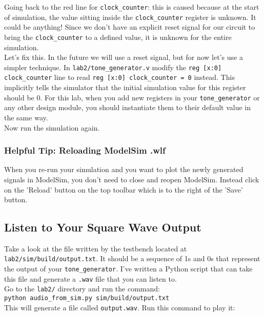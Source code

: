 \documentclass[11pt]{article}
\begin{document}
Going back to the red line for \verb|clock_counter|: this is caused because at the start of simulation, the value sitting inside the \verb|clock_counter| register is unknown. It could be anything! Since we don't have an explicit reset signal for our circuit to bring the \verb|clock_counter| to a defined value, it is unknown for the entire simulation.\\

Let's fix this. In the future we will use a reset signal, but for now let's use a simpler technique. In \verb|lab2/tone_generator.v| modify the \verb|reg [x:0] clock_counter| line to read \verb|reg [x:0] clock_counter = 0| instead. This implicitly tells the simulator that the initial simulation value for this register should be 0. For this lab, when you add new registers in your \verb|tone_generator| or any other design module, you should instantiate them to their default value in the same way.\\

Now run the simulation again.

\subsubsection{Helpful Tip: Reloading ModelSim .wlf}

When you re-run your simulation and you want to plot the newly generated signals in ModelSim, you don't need to close and reopen ModelSim. Instead click on the 'Reload' button on the top toolbar which is to the right of the 'Save' button.

\subsection{Listen to Your Square Wave Output}

Take a look at the file written by the testbench located at \verb|lab2/sim/build/output.txt|. It should be a sequence of 1s and 0s that represent the output of your \verb|tone_generator|. I've written a Python script that can take this file and generate a \verb|.wav| file that you can listen to.\\

Go to the \verb|lab2/| directory and run the command:\\

\verb|python audio_from_sim.py sim/build/output.txt|\\

This will generate a file called \verb|output.wav|. Run this command to play it:\\
\end{document}
